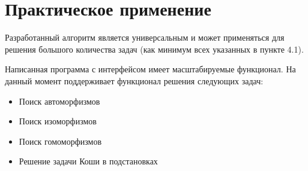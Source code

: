 \section{Практическое применение}
\label{sec:AlgoPractice_6} 
\large

Разработанный алгоритм является универсальным и может применяться для решения большого количества задач (как минимум всех указанных в пункте 4.1).

Написанная программа с интерфейсом имеет масштабируемые функционал. На данный момент поддерживает функционал решения следующих задач:

\begin{itemize}
\item Поиск автоморфизмов
\item Поиск изоморфизмов
\item Поиск гомоморфизмов
\item Решение задачи Коши в подстановках
\end{itemize}